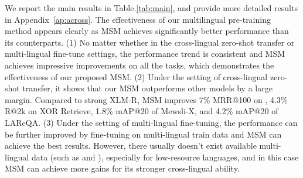 
We report the main results in Table.\ref{tab:main}, and provide more detailed results in Appendix~\ref{ap:across}.
The effectiveness of our multilingual pre-training method appears clearly as MSM achieves significantly better performance than its counterparts. (1) No matter whether in the cross-lingual zero-shot transfer or multi-lingual fine-tune settings, the performance trend is consistent and MSM achieves impressive improvements on all the tasks, which demonstrates the effectiveness of our proposed MSM. (2) Under the setting of cross-lingual zero-shot transfer, it shows that our MSM outperforms other models by a large margin. Compared to strong XLM-R, MSM improves 7\% MRR@100 on \tydi, 4.3\% R@2k on XOR Retrieve, 1.8\% mAP@20 of Mewsli-X, and 4.2\% mAP@20 of LAReQA. (3) Under the setting of multi-lingual fine-tuning, the performance can be further improved by fine-tuning on multi-lingual train data and MSM can achieve the best results. However, there usually doesn't exist available multi-lingual data (such as \news and \lqa), especially for low-resource languages, and in this case MSM can achieve more gains for its stronger cross-lingual ability.




